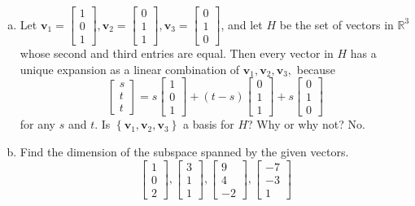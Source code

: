 \begin{enumerate}[(a)]
    \item Let $\mathbf{v}_{1}=\left[\begin{array}{l}1 \\ 0 \\ 1\end{array}\right], \mathbf{v}_{2}=\left[\begin{array}{l}0 \\ 1 \\ 1\end{array}\right], \mathbf{v}_{3}=\left[\begin{array}{l}0 \\ 1 \\ 0\end{array}\right]$, and let $H$ be the set of vectors in $\mathbb{R}^{3}$ whose second and third entries are equal. Then every vector in $H$ has a unique expansion as a linear combination of $\mathbf{v}_{1}, \mathbf{v}_{2}, \mathbf{v}_{3},$ because
    $$\left[\begin{array}{l}s \\ t \\ t\end{array}\right]=s\left[\begin{array}{l}1 \\ 0 \\ 1\end{array}\right]+(t-s)\left[\begin{array}{l}0 \\ 1 \\ 1\end{array}\right]+s\left[\begin{array}{l}0 \\ 1 \\ 0\end{array}\right]
    $$
    for any $s$ and $t$. Is $\left\{\mathbf{v}_{1}, \mathbf{v}_{2}, \mathbf{v}_{3}\right\}$ a basis for $H$? Why or why not?
    No.
    \item Find the dimension of the subspace spanned by the given vectors.
    $$
    \left[\begin{array}{l}1 \\ 0 \\ 2\end{array}\right],\left[\begin{array}{l}3 \\ 1 \\ 1\end{array}\right],\left[\begin{array}{r}9 \\ 4 \\ -2\end{array}\right],\left[\begin{array}{r}-7 \\ -3 \\ 1\end{array}\right]
$$
\end{enumerate}
